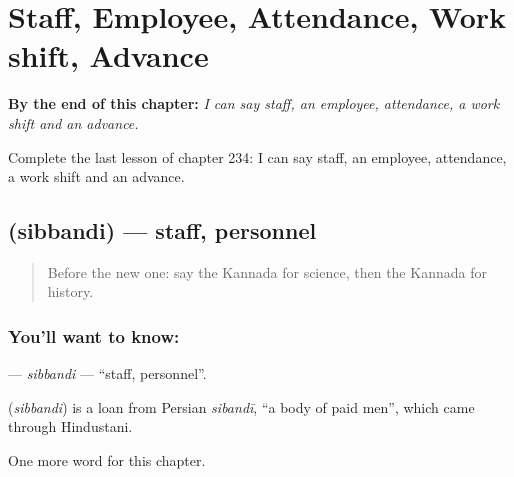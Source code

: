 
\chapter{Staff, Employee, Attendance, Work shift, Advance}
\label{ch:ka-staff-employee-attendance-work-shift-advance}

\begin{chapteropening}
\textbf{By the end of this chapter:} \emph{I can say staff, an employee, attendance, a work shift and an advance.}

Complete the last lesson of chapter 234: I can say staff, an employee, attendance, a work shift and an advance.
\end{chapteropening}

\section[\texorpdfstring{\kn{ಸಿಬ್ಬಂದಿ} (sibbandi)}{ಸಿಬ್ಬಂದಿ (sibbandi)}]{ (sibbandi) — staff, personnel}

\label{lesson:KA-C234-sibbandi}



\begin{quote}
Before the new one: say the Kannada for science, then the Kannada for history.
\end{quote}

\subsection*{You'll want to know: }
\textbf{} — \emph{sibbandi} — \textquotedblleft{}staff, personnel\textquotedblright{}.

\begin{cousinweb}
\textbf{} (\emph{sibbandi}) is a loan from Persian \emph{sibandī}, \textquotedblleft{}a body of paid men\textquotedblright{}, which came through Hindustani.
\end{cousinweb}

\begin{grammarlens}[title={What you've built}]
One more word for this chapter.
\end{grammarlens}

